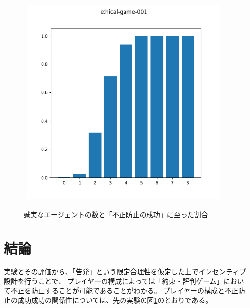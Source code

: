 \begin{figure}[h]
  \begin{tabular}{cc}
    \begin{minipage}[t]{1\hsize}
      \centering
      \includegraphics[keepaspectratio, width=1\linewidth]{./06_ethical-prgame/ethical-game-001.png}
      \caption{誠実なエージェントの数と「不正防止の成功」に至った割合}
      \label{ethical-game-001}
    \end{minipage}
  \end{tabular}
\end{figure}

\section{結論}
実験とその評価から、「告発」という限定合理性を仮定した上でインセンティブ設計を行うことで、
プレイヤーの構成によっては「約束・評判ゲーム」において不正を防止することが可能であることがわかる。
プレイヤーの構成と不正防止の成功成功の関係性については、先の実験の図\ref{ethical-game-001}のとおりである。
